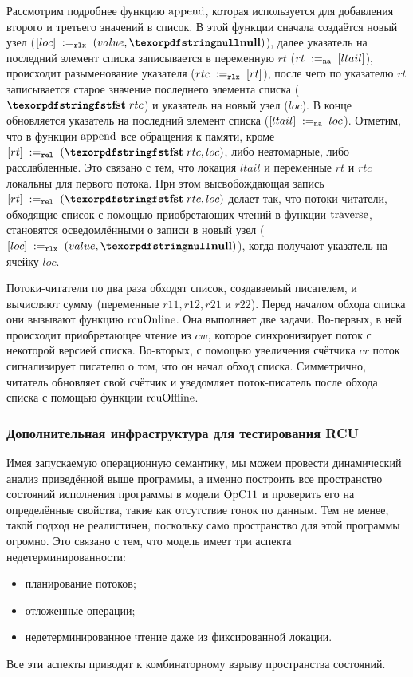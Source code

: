 Рассмотрим подробнее функцию ${\rm append}$, которая используется для добавления второго и третьего значений в список.
В этой функции сначала создаётся новый узел ($\writeInstParam{\rlx}{loc}{(value, \nullPtr)}$),
далее указатель на последний элемент списка записывается в переменную $rt$ ($rt \;:=_{\mathtt{na}}\;[ltail]$),
происходит разыменование указателя ($rtc \;:=_{\mathtt{rlx}}\;[rt]$),
после чего по указателю $rt$ записывается старое значение последнего элемента списка ($\kw{fst} \; rtc$)
и указатель на новый узел ($loc$).
В конце обновляется указатель на последний элемент списка ($[ltail] \;:=_{\mathtt{na}}\;loc$).
Отметим, что в функции ${\rm append}$ все обращения к памяти, кроме $\writeInstParam{\rel}{rt}{(\kw{fst} \; rtc, loc)}$,
либо неатомарные, либо расслабленные. Это связано с тем, что локация $ltail$ и переменные $rt$ и $rtc$ локальны
для первого потока. При этом высвобождающая запись $\writeInstParam{\rel}{rt}{(\kw{fst} \; rtc, loc)}$
делает так, что потоки-читатели, обходящие список с помощью приобретающих чтений в функции ${\rm traverse}$,
становятся осведомлёнными о записи в новый узел ($\writeInstParam{\rlx}{loc}{(value, \nullPtr)}$),
когда получают указатель на ячейку $loc$.

Потоки-читатели по два раза обходят список, создаваемый писателем, и вычисляют сумму (переменные $r11, r12, r21$ и $r22$).
Перед началом обхода списка они вызывают функцию ${\rm rcuOnline}$.
Она выполняет две задачи. Во-первых, в ней происходит приобретающее чтение из $cw$, которое синхронизирует
поток с некоторой версией списка. Во-вторых, с помощью увеличения счётчика $cr$ поток сигнализирует писателю о том,
что он начал обход списка.
Симметрично, читатель обновляет свой счётчик и уведомляет поток-писатель после обхода списка с помощью функции ${\rm rcuOffline}$.

\subsubsection{Дополнительная инфраструктура для тестирования RCU}
Имея запускаемую операционную семантику, мы можем провести динамический анализ приведённой выше программы,
а именно построить все пространство состояний исполнения программы в модели $\mathrm{OpC11}$ и проверить его на
определённые свойства, такие как отсутствие гонок по данным.
Тем не менее, такой подход не реалистичен, поскольку само пространство для этой программы огромно.
Это связано с тем, что модель имеет три аспекта недетерминированности:
\begin{itemize}
  \item планирование потоков;
  \item отложенные операции;
  \item недетерминированное чтение даже из фиксированной локации.
\end{itemize}
Все эти аспекты приводят к комбинаторному взрыву пространства состояний.

